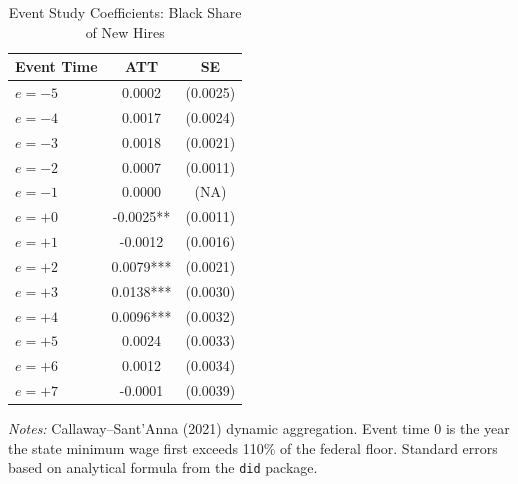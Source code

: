 
\begin{table}[H]
\centering
\caption{Event Study Coefficients: Black Share of New Hires}
\label{tab:event_study}
\begin{threeparttable}
\begin{tabular}{lcc}
\toprule
Event Time & ATT & SE \\
\midrule
$e = -5$ & 0.0002 & (0.0025) \\
$e = -4$ & 0.0017 & (0.0024) \\
$e = -3$ & 0.0018 & (0.0021) \\
$e = -2$ & 0.0007 & (0.0011) \\
$e = -1$ & 0.0000 & (NA) \\
$e = +0$ & -0.0025** & (0.0011) \\
$e = +1$ & -0.0012 & (0.0016) \\
$e = +2$ & 0.0079*** & (0.0021) \\
$e = +3$ & 0.0138*** & (0.0030) \\
$e = +4$ & 0.0096*** & (0.0032) \\
$e = +5$ & 0.0024 & (0.0033) \\
$e = +6$ & 0.0012 & (0.0034) \\
$e = +7$ & -0.0001 & (0.0039) \\
\bottomrule
\end{tabular}
\begin{tablenotes}[flushleft]
\small
\item \textit{Notes:} Callaway--Sant'Anna (2021) dynamic aggregation. Event time 0 is the year the state minimum wage first exceeds 110\% of the federal floor. Standard errors based on analytical formula from the \texttt{did} package.
\end{tablenotes}
\end{threeparttable}
\end{table}

